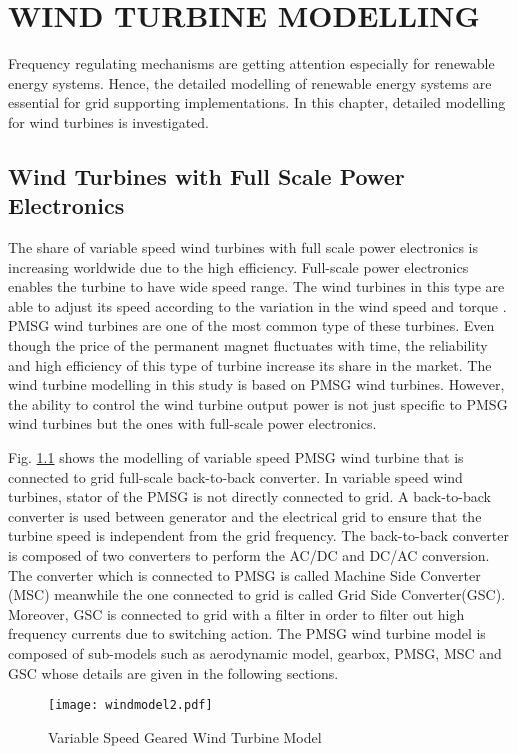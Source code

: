 \chapter{WIND TURBINE MODELLING}
\label{chp:3}
Frequency regulating mechanisms are getting attention especially for renewable energy systems. Hence, the detailed modelling of renewable energy systems are essential for grid supporting implementations. In this chapter, detailed modelling for wind turbines is investigated.
\section{Wind Turbines with Full Scale Power Electronics}
The share of variable speed wind turbines with full scale power electronics is increasing worldwide due to the high efficiency. Full-scale power electronics enables the turbine to have wide speed range. The wind turbines in this type are able to adjust its speed according to the variation in the wind speed and torque \cite{Chen2009b}. PMSG wind turbines are one of the most common type of these turbines. Even though the price of the permanent magnet fluctuates with time, the reliability and high efficiency of this type of turbine increase its share in the market. The wind turbine modelling in this study is based on PMSG wind turbines. However, the ability to control the wind turbine output power is not just specific to PMSG wind turbines but the ones with full-scale power electronics. \par
Fig. \ref{varspeedpmsg} shows the modelling of variable speed PMSG wind turbine that is connected to grid full-scale back-to-back converter. In variable speed wind turbines, stator of the PMSG is not directly connected to grid. A back-to-back converter is used between generator and the electrical grid to ensure that the turbine speed is independent from the grid frequency. The back-to-back converter is composed of two converters to perform the AC/DC and DC/AC conversion. The converter which is connected to PMSG is called Machine Side Converter (MSC) meanwhile the one connected to grid is called Grid Side Converter(GSC). Moreover, GSC is connected to grid with a filter in order to filter out high frequency currents due to switching action. The PMSG wind turbine model is composed of sub-models such as aerodynamic model, gearbox, PMSG, MSC and GSC whose details are given in the following sections.\par
 \begin{figure}[h]
	\centering
	\texttt{[image: windmodel2.pdf]}
	\caption{Variable Speed Geared Wind Turbine Model}
	\label{varspeedpmsg}
\end{figure} 

